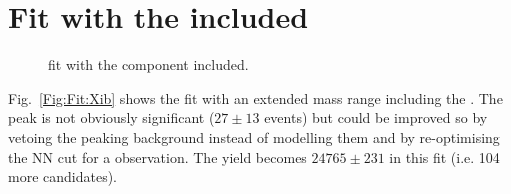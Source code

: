 \section{Fit with the \Xib included}\label{Sec:Xib}
\begin{figure}[t]\twoplots
{} 
\caption{\PsipK fit with the \Xib component included.}
\label{Fig:XibFit}
\end{figure}
Fig.~\ref{Fig:Fit:Xib} shows the \PsipK fit with an extended mass range including the \Xib.
The peak is not obviously significant ($27\pm13$ events) but could be improved so by
vetoing the peaking background instead of modelling them and by re-optimising the NN cut
for a \Xib\to\PsipK observation. The \LbK yield becomes $24765 \pm 231$ in this fit
(i.e. 104 more candidates). 
